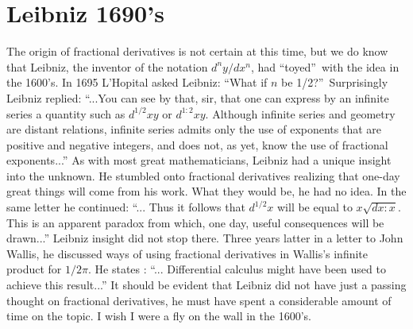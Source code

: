 \documentclass[a4paper,14pt,oneside]{book}
\theoremstyle{plain}
\theoremstyle{definition}
\theoremstyle{remark}
\begin{document}
         \section{Leibniz 1690's}
         \begin{center}
         \begin{flushleft} 
         \justify
         \Large{
\par{The origin of fractional derivatives is not certain at this time, but we do know that Leibniz, the inventor of the notation $d^{n} y / dx^{n}$, had \textquotedblleft toyed\textquotedblright ~with the idea in the 1600's. In 1695 L'Hopital asked Leibniz: \textquotedblleft What if $n$ be 1/2?\textquotedblright ~Surprisingly Leibniz \cite{bb1} replied: \enquote{...You can see by that, sir, that one can express by an infinite series a quantity such as $d^{1 / 2} x y$ or $d^{1:2}x y$. Although infinite series and geometry are distant relations, infinite series admits only the use of exponents that are positive and negative integers, and does not, as yet, know the use of fractional exponents...} As with most great mathematicians, Leibniz had a unique insight into the unknown. He stumbled onto fractional derivatives realizing that one-day great things will come from his work. What they would be, he had no idea. In the same letter he continued: \enquote{... Thus it follows that $d^{1 / 2} x$ will be equal to $x \sqrt{dx: x}$. This is an apparent paradox from which, one day, useful consequences will be drawn...} Leibniz insight did not stop there. Three years latter in a letter to John Wallis, he discussed ways of using fractional derivatives in Wallis's infinite product for $1 / 2 \pi$. He states \cite{bb2}: \enquote{... Differential calculus might have been used to achieve this result...} It should be evident that Leibniz did not have just a passing thought on fractional derivatives, he must have spent a considerable amount of time on the topic. I wish I were a fly on the wall in the 1600's.}}
\end{flushleft}        \end{center}
\end{document}
